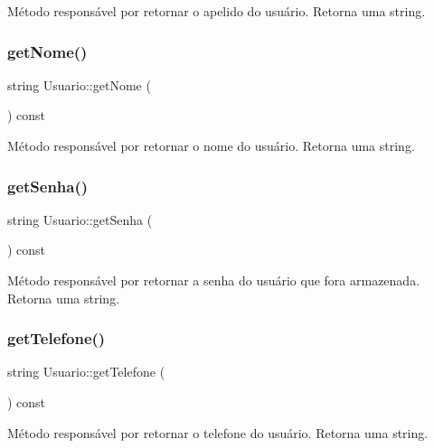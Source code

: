 Método responsável por retornar o apelido do usuário. Retorna uma string. \mbox{\label{classUsuario_a6aeb8cccd96e84aedeb50a68b4f9a3d4}} 
\subsubsection{\texorpdfstring{get\+Nome()}{getNome()}}
{\footnotesize\ttfamily string Usuario\+::get\+Nome (\begin{DoxyParamCaption}{ }\end{DoxyParamCaption}) const\hspace{0.3cm}{\ttfamily [inline]}}

Método responsável por retornar o nome do usuário. Retorna uma string. \mbox{\label{classUsuario_a5a6149716b03d4b1408aaa6a0dc4bb32}} 
\subsubsection{\texorpdfstring{get\+Senha()}{getSenha()}}
{\footnotesize\ttfamily string Usuario\+::get\+Senha (\begin{DoxyParamCaption}{ }\end{DoxyParamCaption}) const\hspace{0.3cm}{\ttfamily [inline]}}

Método responsável por retornar a senha do usuário que fora armazenada. Retorna uma string. \mbox{\label{classUsuario_ae2a44b0716930c62458e6fc8c7339537}} 
\subsubsection{\texorpdfstring{get\+Telefone()}{getTelefone()}}
{\footnotesize\ttfamily string Usuario\+::get\+Telefone (\begin{DoxyParamCaption}{ }\end{DoxyParamCaption}) const\hspace{0.3cm}{\ttfamily [inline]}}

Método responsável por retornar o telefone do usuário. Retorna uma string. \mbox{\label{classUsuario_a1da1c9170ba41c06b9adea159d21c092}} 
